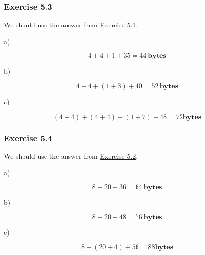 \documentclass[../../main.tex]{subfiles}
\begin{document}
\subsubsection*{Exercise 5.3}

We should use the answer from \hyperlink{Exercise13.5.1}{Exercise 5.1}.

a)

$$
4 + 4 + 1 + 35 = 44 \ \mathbf{bytes}
$$

b)

$$
4 + 4 + (1 + 3) + 40 = 52 \ \mathbf{bytes}
$$

c)

$$
(4 + 4) + (4 + 4 )+ (1 + 7) + 48 = 72 \mathbf{bytes}
$$

\subsubsection*{Exercise 5.4}

We should use the answer from \hyperlink{Exercise13.5.2}{Exercise 5.2}.

a)

$$
8 + 20 + 36 = 64 \ \mathbf{bytes}
$$

b)

$$
8 + 20 + 48 = 76 \ \mathbf{bytes}
$$

c)

$$
8 + (20 + 4) + 56 = 88 \mathbf{bytes}
$$
\end{document}
